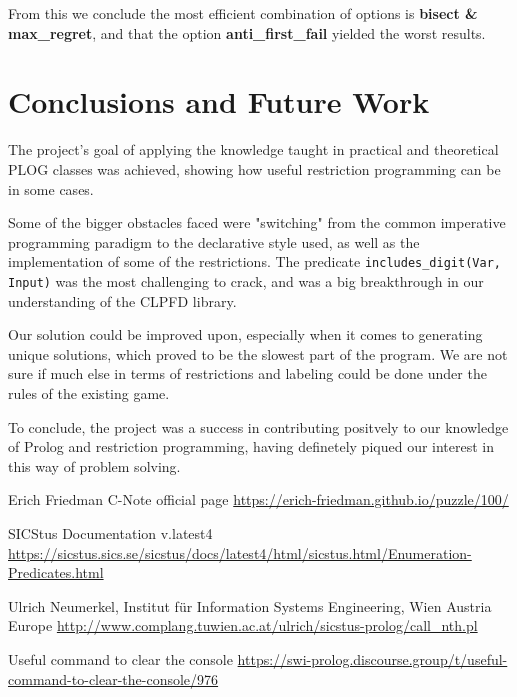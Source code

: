 \documentclass[runningheads]{llncs}
\begin{document}
From this we conclude the most efficient combination of options is \textbf{bisect \& max\_regret}, and that the option \textbf{anti\_first\_fail} yielded the worst results.

\section{Conclusions and Future Work}
The project's goal of applying the knowledge taught in practical and theoretical PLOG classes was achieved, showing how useful restriction programming can be in some cases. 

Some of the bigger obstacles faced were "switching" from the common imperative programming paradigm to the declarative style used, as well as the implementation of some of the restrictions. The predicate \verb!includes_digit(Var, Input)! was the most challenging to crack, and was a big breakthrough in our understanding of the CLPFD library.

Our solution could be improved upon, especially when it comes to generating unique solutions, which proved to be the slowest part of the program. We are not sure if much else in terms of restrictions and labeling could be done under the rules of the existing game.

To conclude, the project was a success in contributing positvely to our knowledge of Prolog and restriction programming, having definetely piqued our interest in this way of problem solving.
\begin{thebibliography}{8}





Erich Friedman
C-Note official page
\url{https://erich-friedman.github.io/puzzle/100/}

SICStus Documentation v.latest4 
\url{https://sicstus.sics.se/sicstus/docs/latest4/html/sicstus.html/Enumeration-Predicates.html}

Ulrich Neumerkel, Institut für Information Systems Engineering, Wien Austria Europe
\url{http://www.complang.tuwien.ac.at/ulrich/sicstus-prolog/call_nth.pl}

Useful command to clear the console
\url{https://swi-prolog.discourse.group/t/useful-command-to-clear-the-console/976}

\end{thebibliography}
\end{document}
